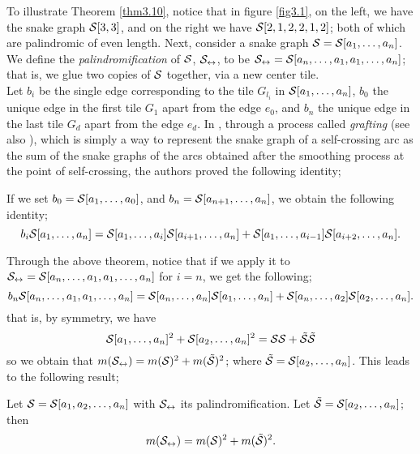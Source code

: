 To illustrate Theorem \ref{thm3.10}, notice that in figure \ref{fig3.1}, on the left, we have the snake graph $\mathcal{S}[3,3]$, and on the right we have $\mathcal{S}[2,1,2,2,1,2]$; both of which are palindromic of even length. Next, consider a snake graph $\mathcal{S}=\mathcal{S}[a_1,\dots,a_n]$. We define the \emph{palindromification} of $\mathcal{S}$, $\mathcal{S}_{\leftrightarrow}$, to be $\mathcal{S}_{\leftrightarrow} = \mathcal{S}[a_n,\dots,a_1,a_1,\dots,a_n]$; that is, we glue two copies of $\mathcal{S}$ together, via a new center tile. 
\\

Let $b_i$ be the single edge corresponding to the tile $G_{l_i}$ in $\mathcal{S}[a_1,\dots,a_n]$, $b_0$ the unique edge in the first tile $G_1$ apart from the edge $e_0$, and $b_n$ the unique edge in the last tile $G_d$ apart from the edge $e_d$. In \cite{CS2}, through a process called \emph{grafting} (see also \cite{CS3}), which is simply a way to represent the snake graph of a self-crossing arc as the sum of the snake graphs of the arcs obtained after the smoothing process at the point of self-crossing, the authors proved the following identity;
\begin{theorem}\label{thm3.11}
    If we set $b_0 = \mathcal{S}[a_1,\dots,a_0]$, and $b_n = \mathcal{S}[a_{n+1},\dots,a_n]$, we obtain the following identity;
\begin{equation*}
    b_i\mathcal{S}[a_1,\dots,a_n] = \mathcal{S}[a_1,\dots,a_i]\mathcal{S}[a_{i+1},\dots,a_n]+\mathcal{S}[a_1,\dots,a_{i-1}]\mathcal{S}[a_{i+2},\dots,a_n].
\end{equation*}
\end{theorem}
Through the above theorem, notice that if we apply it to $\mathcal{S}_{\leftrightarrow} = \mathcal{S}[a_n,\dots,a_1,a_1,\dots,a_n]$ for $i=n$, we get the following;
\begin{equation*}
    b_n\mathcal{S}[a_n,\dots,a_1,a_1,\dots,a_n] = \mathcal{S}[a_n,\dots,a_n]\mathcal{S}[a_1,\dots,a_n]+\mathcal{S}[a_n,\dots,a_2]\mathcal{S}[a_2,\dots,a_n].
\end{equation*}
that is, by symmetry, we have 
\begin{equation}
    \mathcal{S}[a_1,\dots,a_n]^2 + \mathcal{S}[a_2,\dots,a_n]^2 = \mathcal{S}\mathcal{S} + \Tilde{\mathcal{S}}\Tilde{\mathcal{S}}
\end{equation}
so we obtain that $m(\mathcal{S}_{\leftrightarrow}) = m(\mathcal{S})^2 + m(\Tilde{\mathcal{S}})^2$; where $\Tilde{\mathcal{S}} = \mathcal{S}[a_2,\dots,a_n]$. This leads to the following result;
\begin{theorem}\label{thm3.12}
    Let $\mathcal{S} = \mathcal{S}[a_1,a_2,\dots,a_n]$ with $\mathcal{S}_{\leftrightarrow}$ its palindromification. Let $\Tilde{\mathcal{S}} = \mathcal{S}[a_2,\dots,a_n]$; then
    \begin{equation*}
        m(\mathcal{S}_{\leftrightarrow}) = m(\mathcal{S})^2 + m(\Tilde{\mathcal{S}})^2.
    \end{equation*}
\end{theorem}
